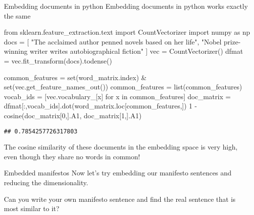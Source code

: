 \documentclass[
  10pt,
  ignorenonframetext,
  aspectratio=169]{beamer}
\newenvironment{Shaded}{\begin{snugshade}}{\end{snugshade}}
\newcommand{\BuiltInTok}[1]{\textcolor[rgb]{0.80,0.80,0.80}{#1}}
\newcommand{\ControlFlowTok}[1]{\textcolor[rgb]{0.94,0.87,0.69}{#1}}
\newcommand{\DecValTok}[1]{\textcolor[rgb]{0.86,0.86,0.80}{#1}}
\newcommand{\ImportTok}[1]{\textcolor[rgb]{0.80,0.80,0.80}{#1}}
\newcommand{\KeywordTok}[1]{\textcolor[rgb]{0.94,0.87,0.69}{#1}}
\newcommand{\NormalTok}[1]{\textcolor[rgb]{0.80,0.80,0.80}{#1}}
\newcommand{\OperatorTok}[1]{\textcolor[rgb]{0.94,0.94,0.82}{#1}}
\newcommand{\StringTok}[1]{\textcolor[rgb]{0.80,0.58,0.58}{#1}}
\begin{document}
\begin{frame}[fragile]{Embedding documents in python}
\protect\hypertarget{embedding-documents-in-python}{}
Embedding documents in python works exactly the same

\medskip

\scriptsize

\begin{Shaded}
\begin{Highlighting}[]
\ImportTok{from}\NormalTok{ sklearn.feature\_extraction.text }\ImportTok{import}\NormalTok{ CountVectorizer}
\ImportTok{import}\NormalTok{ numpy }\ImportTok{as}\NormalTok{ np}
\NormalTok{docs }\OperatorTok{=}\NormalTok{ [}
  \StringTok{"The acclaimed author penned novels based on her life"}\NormalTok{,}
  \StringTok{"Nobel prize{-}winning writer writes autobiographical fiction"}
\NormalTok{]}
\NormalTok{vec }\OperatorTok{=}\NormalTok{ CountVectorizer()}
\NormalTok{dfmat }\OperatorTok{=}\NormalTok{ vec.fit\_transform(docs).todense()}

\NormalTok{common\_features }\OperatorTok{=} \BuiltInTok{set}\NormalTok{(word\_matrix.index) }\OperatorTok{\&} \BuiltInTok{set}\NormalTok{(vec.get\_feature\_names\_out())}
\NormalTok{common\_features }\OperatorTok{=} \BuiltInTok{list}\NormalTok{(common\_features)}
\NormalTok{vocab\_ids }\OperatorTok{=}\NormalTok{ [vec.vocabulary\_[x] }\ControlFlowTok{for}\NormalTok{ x }\KeywordTok{in}\NormalTok{ common\_features]}
\NormalTok{doc\_matrix }\OperatorTok{=}\NormalTok{ dfmat[:,vocab\_ids].dot(word\_matrix.loc[common\_features,])}
\DecValTok{1} \OperatorTok{{-}}\NormalTok{ cosine(doc\_matrix[}\DecValTok{0}\NormalTok{,].A1, doc\_matrix[}\DecValTok{1}\NormalTok{,].A1)}
\end{Highlighting}
\end{Shaded}

\begin{verbatim}
## 0.7854257726317803
\end{verbatim}

\medskip

\normalsize

The cosine similarity of these documents in the embedding space is very
high, even though they share no words in common!
\end{frame}

\begin{frame}{Embedded manifestos}
\protect\hypertarget{embedded-manifestos}{}
Now let's try embedding our manifesto sentences and reducing the
dimensionality.

Can you write your own manifesto sentence and find the real sentence
that is most similar to it?
\end{frame}
\end{document}
